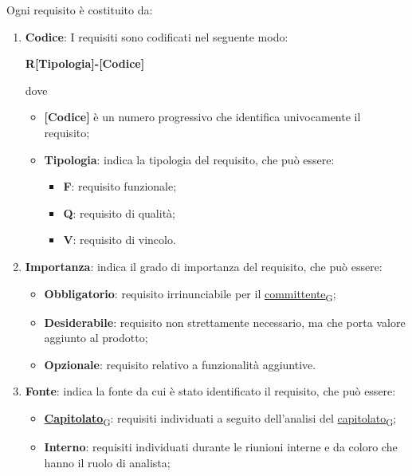 Ogni requisito è costituito da:
\begin{enumerate}
	\item \textbf{Codice}: I requisiti sono codificati nel seguente modo:
	      \begin{center}
		      \textbf{R[Tipologia]-[Codice]}
	      \end{center}
	      dove
	      \begin{itemize}
		      \item \textbf{[Codice]} è un numero progressivo che identifica univocamente il requisito;
		      \item \textbf{Tipologia}: indica la tipologia del requisito, che può essere:
		            \begin{itemize}
			            \item \textbf{F}: requisito funzionale;
			            \item \textbf{Q}: requisito di qualità;
			            \item \textbf{V}: requisito di vincolo.
		            \end{itemize}
	      \end{itemize}
	\item \textbf{Importanza}: indica il grado di importanza del requisito, che può essere:
	      \begin{itemize}
		      \item \textbf{Obbligatorio}: requisito irrinunciabile per il \href{https://7last.github.io/docs/rtb/documentazione-interna/glossario\#committente}{committente\textsubscript{G}};
		      \item \textbf{Desiderabile}: requisito non strettamente necessario, ma che porta valore aggiunto al prodotto;
		      \item \textbf{Opzionale}: requisito relativo a funzionalità aggiuntive.
	      \end{itemize}
	\item \textbf{Fonte}: indica la fonte da cui è stato identificato il requisito, che può essere:
	      \begin{itemize}
		      \item \href{https://7last.github.io/docs/rtb/documentazione-interna/glossario\#capitolato}{\textbf{Capitolato}\textsubscript{G}}: requisiti individuati a seguito dell'analisi del \href{https://7last.github.io/docs/rtb/documentazione-interna/glossario\#capitolato}{capitolato\textsubscript{G}};
		      \item \textbf{Interno}: requisiti individuati durante le riunioni interne e da coloro che hanno il ruolo di analista;

\end{itemize}
\end{enumerate}
